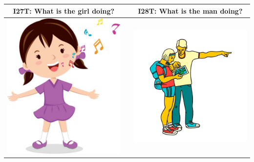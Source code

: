 \documentclass[12pt,notitlepage]{article}
\begin{document}
\begin{center}
\begin{tabular}{|c|c|c|}
\hline
I27T: What is the girl doing? && I28T: What is the man doing? \\
\hline
\includegraphics[width=20em,trim=0 0 0 -3]{figures/I27.jpg} & & \includegraphics[width=20em,trim=0 0 0 -3]{figures/I28.jpg} \\
\hline
\end{tabular}
\vspace{1em} \\



\end{center}
\end{document}
